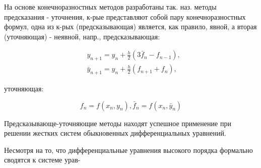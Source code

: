 \documentclass[10pt]{article}
\begin{document}
На основе конечноразностных методов разработаны так. наз. методы предсказания - уточнения, к-рые представляют собой пару конечноразностных формул, одна из к-рых (предсказывающая) является, как правило, явной, а вторая (уточняющая) - неявной, напр., предсказывающая:



\[

\begin{aligned}

& y_{n+1}=y_{n}+\frac{h}{2}\left(3 \bar{f}_{n}-f_{n-1}\right), \\

& \bar{y}_{n+1}=y_{n}+\frac{h}{2}\left(f_{n+1}+f_{n}\right),

\end{aligned}

\]



уточняющая:



\[

f_{n}=f\left(x_{n}, y_{n}\right), \bar{f}_{n}=f\left(x_{n}, \bar{y}_{n}\right)

\]



Предсказывающе-уточняющие методы находят успешное применение при решении жестких систем обыкновенных дифференциальных уравнений.



Несмотря на то, что дифференциальные уравнения высокого порядка формально сводятся к системе урав-
\end{document}
